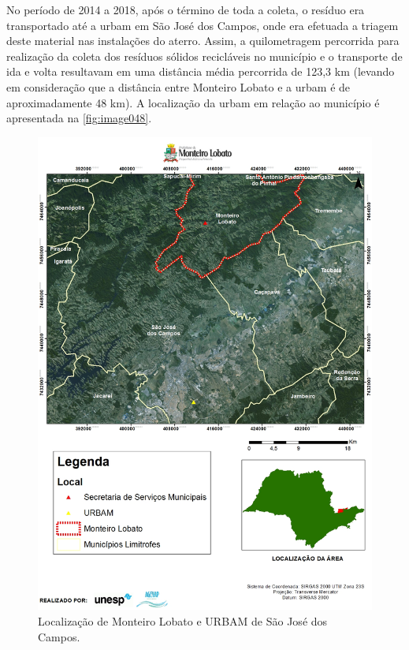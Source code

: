 	
	No período de 2014 a 2018, após o término de toda a coleta, o resíduo era transportado até a \gls{urbam} em São José dos Campos, onde era efetuada a triagem deste material nas instalações do aterro. Assim, a quilometragem percorrida para realização da coleta dos resíduos sólidos recicláveis no município e o transporte de ida e volta resultavam em uma distância média percorrida de 123,3 km (levando em consideração que a distância entre Monteiro Lobato e a \gls{urbam} é de aproximadamente 48 km). A localização da \gls{urbam} em relação ao município é apresentada na \autoref{fig:image048}.
	
	\begin{figure}
		\centering
		\includegraphics[width=1\linewidth]{produtos/prodtres/image048}
		\caption{Localização de Monteiro Lobato e URBAM de São José dos Campos.}
		\label{fig:image048}
	\end{figure}
	
